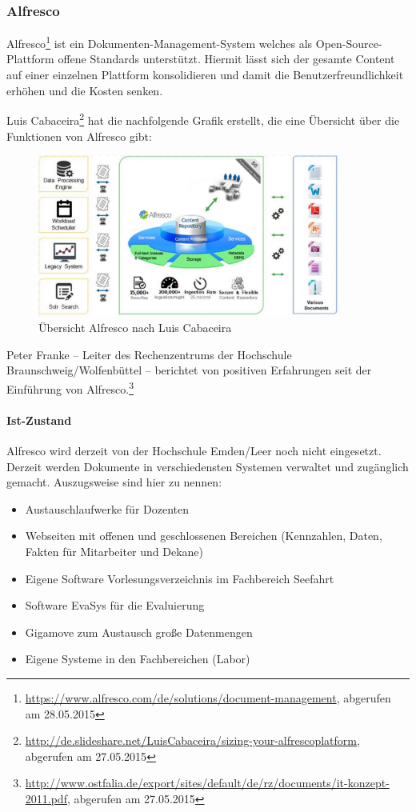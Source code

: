 \subsubsection{Alfresco}
Alfresco\footnote{\url{https://www.alfresco.com/de/solutions/document-management}, abgerufen am 28.05.2015} ist ein Dokumenten-Management-System welches als Open-Source-Plattform offene Standards unterstützt. Hiermit lässt sich der gesamte Content auf einer einzelnen Plattform konsolidieren und damit die Benutzerfreundlichkeit erhöhen und die Kosten senken.

Luis Cabaceira\footnote{\url{http://de.slideshare.net/LuisCabaceira/sizing-your-alfrescoplatform}, abgerufen am 27.05.2015} hat die nachfolgende Grafik erstellt, die eine Übersicht über die Funktionen von Alfresco gibt:

\begin{figure}[h!]
	\centering
	\includegraphics[width=10cm]{kapitel/gruppe4_1/bilder/uebersicht_alfresco}
	\caption{Übersicht Alfresco nach Luis Cabaceira}
	\label{fig_uebersicht_alfresco}
\end{figure}

Peter Franke – Leiter des Rechenzentrums der Hochschule Braunschweig/Wolfenbüttel – berichtet von positiven Erfahrungen seit der Einführung von Alfresco.\footnote{\url{http://www.ostfalia.de/export/sites/default/de/rz/documents/it-konzept-2011.pdf}, abgerufen am 27.05.2015}

\paragraph{Ist-Zustand}
Alfresco wird derzeit von der Hochschule Emden/Leer noch nicht eingesetzt. Derzeit werden Dokumente in verschiedensten Systemen verwaltet und zugänglich gemacht. Auszugsweise sind hier zu nennen:

\begin{itemize}
	\item Austauschlaufwerke für Dozenten
	\item Webseiten mit offenen und geschlossenen Bereichen (Kennzahlen, Daten, Fakten für Mitarbeiter und Dekane)
	\item Eigene Software Vorlesungsverzeichnis im Fachbereich Seefahrt
	\item Software EvaSys für die Evaluierung
	\item Gigamove zum Austausch große Datenmengen
	\item Eigene Systeme in den Fachbereichen (Labor)	
\end{itemize}

